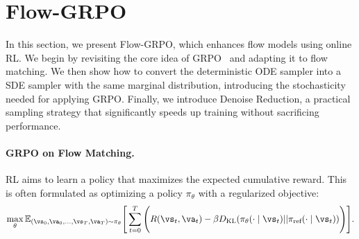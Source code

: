\section{Flow-GRPO}\label{sec:method}


In this section, we present Flow-GRPO, which enhances flow models using online RL. We begin by revisiting the core idea of GRPO~\cite{grpo} and adapting it to flow matching. We then show how to convert the deterministic ODE sampler into a SDE sampler with the same marginal distribution, introducing the stochasticity needed for applying GRPO. Finally, we introduce Denoise Reduction, a practical sampling strategy that significantly speeds up training without sacrificing performance.

\paragraph{GRPO on Flow Matching.} RL aims to learn a policy that maximizes the expected cumulative reward. This is often formulated as optimizing a policy $\pi_\theta$ with a regularized objective:
\begin{equation}
\label{eq:rl_obj}
\max_{\theta} \mathbb{E}_{(\vs_0,\va_0,\dots,\vs_T,\va_T) \sim \pi_\theta} \Bigg[ \sum_{t=0}^{T} \Bigg( R(\vs_t, \va_t) - \beta D_{\text{KL}}(\pi_{\theta}( \cdot \mid \vs_t) || \pi_{\text{ref}}( \cdot \mid \vs_t)) \Bigg) \Bigg].
\end{equation}

